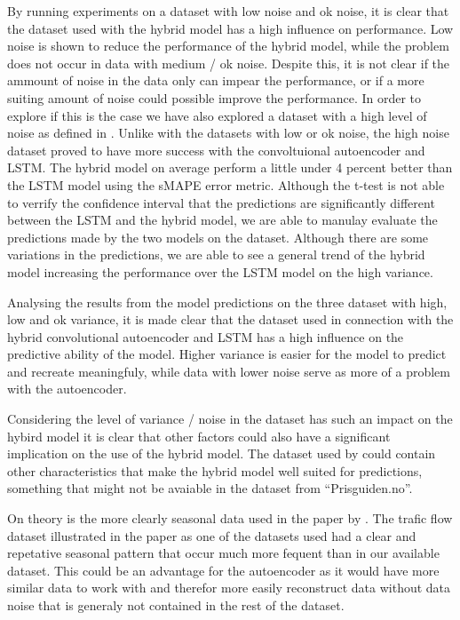 By running experiments on a dataset with low noise and ok noise, it is clear that the dataset used with the hybrid model has a high influence on performance.
Low noise is shown to reduce the performance of the hybrid model, while the problem does not occur in data with medium / ok noise.
Despite this, it is not clear if the ammount of noise in the data only can impear the performance,
or if a more suiting amount of noise could possible improve the performance.
In order to explore if this is the case we have also explored a dataset with a high level of noise as defined in .
Unlike with the datasets with low or ok noise, the high noise dataset proved to have more success with the convoltuional autoencoder and LSTM.
The hybrid model on average perform a little under 4 percent better than the LSTM model using the sMAPE error metric.
Although the t-test is not able to verrify the confidence interval that the predictions are significantly different between the LSTM and the hybrid model,
we are able to manulay evaluate the predictions made by the two models on the dataset.
Although there are some variations in the predictions, we are able to see a general trend of the hybrid model increasing the performance over the LSTM model on the high variance.

Analysing the results from the model predictions on the three dataset with high, low and ok variance,
it is made clear that the dataset used in connection with the hybrid convolutional autoencoder and LSTM
has a high influence on the predictive ability of the model.
Higher variance is easier for the model to predict and recreate meaningfuly,
while data with lower noise serve as more of a problem with the autoencoder. 

Considering the level of variance / noise in the dataset has such an impact on the hybird model it
is clear that other factors could also have a significant implication on the use of the hybrid model.
The dataset used by \cite{Zhao2019} could contain other characteristics that make the hybrid model well suited for predictions,
something that might not be avaiable in the dataset from ``Prisguiden.no''.

On theory is the more clearly seasonal data used in the paper by \cite{Zhao2019}.
The trafic flow dataset illustrated in the paper as one of the datasets used had a clear and repetative seasonal
pattern that occur much more fequent than in our available dataset.
This could be an advantage for the autoencoder as it would have more similar data to work with and therefor more easily
reconstruct data without data noise that is generaly not contained in the rest of the dataset.

